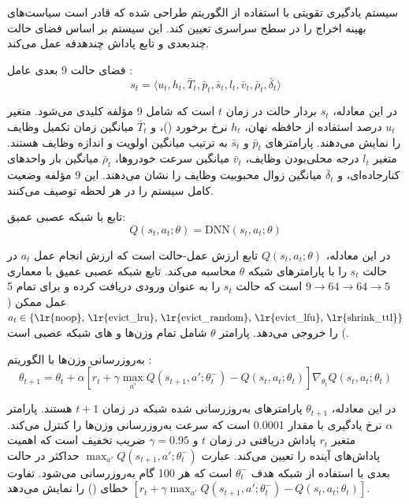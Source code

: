 \documentclass[11pt]{article}
\begin{document}
سیستم یادگیری تقویتی با استفاده از الگوریتم  طراحی شده که قادر است سیاست‌های بهینه اخراج را در سطح سراسری تعیین کند. این سیستم بر اساس فضای حالت چندبعدی و تابع پاداش چندهدفه عمل می‌کند.

فضای حالت 9 بعدی عامل :
\begin{equation}
s_t = \langle u_t, h_t, \bar{T}_t, \bar{p}_t, \bar{s}_t, l_t, \bar{v}_t, \bar{\rho}_t, \bar{\delta}_t \rangle
\label{eq:state_space}
\end{equation}

در این معادله، $s_t$ بردار حالت در زمان $t$ است که شامل 9 مؤلفه کلیدی می‌شود. متغیر $u_t$ درصد استفاده از حافظه نهان، $h_t$ نرخ برخورد ()، و $\bar{T}_t$ میانگین زمان تکمیل وظایف را نمایش می‌دهند. پارامترهای $\bar{p}_t$ و $\bar{s}_t$ به ترتیب میانگین اولویت و اندازه وظایف هستند. متغیر $l_t$ درجه محلی‌بودن وظایف، $\bar{v}_t$ میانگین سرعت خودروها، $\bar{\rho}_t$ میانگین بار واحدهای کنارجاده‌ای، و $\bar{\delta}_t$ میانگین زوال محبوبیت وظایف را نشان می‌دهند. این 9 مؤلفه وضعیت کامل سیستم را در هر لحظه توصیف می‌کنند.

تابع  با شبکه عصبی عمیق:
\begin{equation}
Q(s_t, a_t; \theta) = \text{DNN}(s_t, a_t; \theta)
\label{eq:q_function}
\end{equation}

در این معادله، $Q(s_t, a_t; \theta)$ تابع ارزش عمل-حالت است که ارزش انجام عمل $a_t$ در حالت $s_t$ را با پارامترهای شبکه $\theta$ محاسبه می‌کند. تابع  شبکه عصبی عمیق با معماری $9 \rightarrow 64 \rightarrow 64 \rightarrow 5$ است که حالت $s_t$ را به عنوان ورودی دریافت کرده و  برای تمام 5 عمل ممکن ($a_t \in \{\text{\lr{noop}, \lr{evict\_lru}, \lr{evict\_random}, \lr{evict\_lfu}, \lr{shrink\_ttl}}\}$) را خروجی می‌دهد. پارامتر $\theta$ شامل تمام وزن‌ها و  های شبکه عصبی است.

به‌روزرسانی وزن‌ها با الگوریتم :
\begin{equation}
\theta_{t+1} = \theta_t + \alpha \left[ r_t + \gamma \max_{a'} Q(s_{t+1}, a'; \theta_t^-) - Q(s_t, a_t; \theta_t) \right] \nabla_{\theta_t} Q(s_t, a_t; \theta_t)
\label{eq:dqn_update}
\end{equation}

در این معادله، $\theta_{t+1}$ پارامترهای به‌روزرسانی شده شبکه در زمان $t+1$ هستند. پارامتر $\alpha$ نرخ یادگیری با مقدار 0.0001 است که سرعت به‌روزرسانی وزن‌ها را کنترل می‌کند. متغیر $r_t$ پاداش دریافتی در زمان $t$ و $\gamma = 0.95$ ضریب تخفیف است که اهمیت پاداش‌های آینده را تعیین می‌کند. عبارت $\max_{a'} Q(s_{t+1}, a'; \theta_t^-)$ حداکثر  در حالت بعدی با استفاده از شبکه هدف $\theta_t^-$ است که هر 100 گام به‌روزرسانی می‌شود. تفاوت $[r_t + \gamma \max_{a'} Q(s_{t+1}, a'; \theta_t^-) - Q(s_t, a_t; \theta_t)]$ خطای  () را نمایش می‌دهد.
\end{document}
